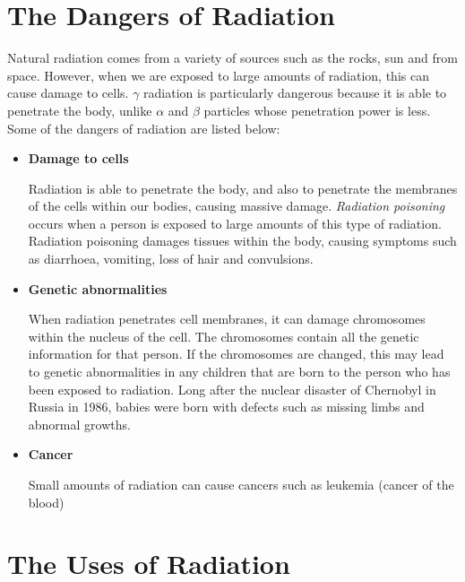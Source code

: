 



\section{The Dangers of Radiation}
\label{sec:an:dangers}

Natural radiation comes from a variety of sources such as the rocks, sun and from space. However, when we are exposed to large amounts of radiation, this can cause damage to cells. $\gamma$ radiation is particularly dangerous because it is able to penetrate the body, unlike $\alpha$ and $\beta$ particles whose penetration power is less. Some of the dangers of radiation are listed below:

\begin{itemize}
\item{\textbf{Damage to cells}}

Radiation is able to penetrate the body, and also to penetrate the membranes of the cells within our bodies, causing massive damage. \textit{Radiation poisoning} occurs when a person is exposed to large amounts of this type of radiation. Radiation poisoning damages tissues within the body, causing symptoms such as diarrhoea, vomiting, loss of hair and convulsions.

\item{\textbf{Genetic abnormalities}}

When radiation penetrates cell membranes, it can damage chromosomes within the nucleus of the cell. The chromosomes contain all the genetic information for that person. If the chromosomes are changed, this may lead to genetic abnormalities in any children that are born to the person who has been exposed to radiation. Long after the nuclear disaster of Chernobyl in Russia in 1986, babies were born with defects such as missing limbs and abnormal growths. 

\item{\textbf{Cancer}}

Small amounts of radiation can cause cancers such as leukemia (cancer of the blood) 

\end{itemize}






\section{The Uses of Radiation}
\label{sec:an:uses}

